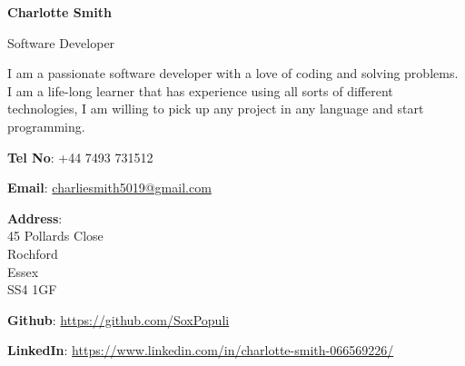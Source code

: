 \documentclass[11pt, twoside, a4paper]{article}
\newlength{\cvMargin}
\newlength{\cvSideWidth}
\begin{document}

\begin{minipage}[t]{\cvSideWidth}
    \begin{center}
        
        {\LARGE \textbf{Charlotte Smith}}
        \vspace*{0.3cm}

        {\Large Software Developer}
        
        \vspace{0.5cm}
        

        \begin{flushleft}
            I am a passionate software developer with a love of coding and solving
            problems. \\
            I am a life-long learner that has experience using all sorts of 
            different technologies, I am willing to pick up any project in any language
            and start programming. \\
        \end{flushleft}
        
        \vspace*{0.5cm}
        \textbf{Tel No}: +44 7493 731512

        \textbf{Email}:
        \href{mailto:charliesmith5019@gmail.com}
        {charliesmith5019@gmail.com}

        \hspace{0.2cm}
            \textbf{Address}: \\
               45 Pollards Close \\
               Rochford \\
               Essex \\
               SS4 1GF \\

        \vspace*{0.5cm}

        \faGithub{}
        \textbf{Github}: 
        \url{https://github.com/SoxPopuli}


        \faLinkedinSquare{}
        \textbf{LinkedIn}:
        \url{https://www.linkedin.com/in/charlotte-smith-066569226/}


\end{center}
\end{minipage}
\end{document}
